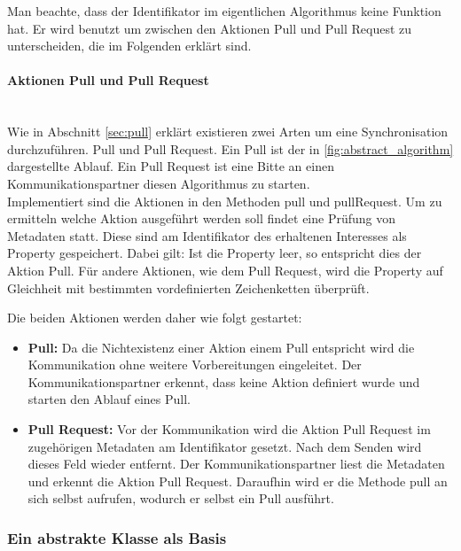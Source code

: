 \documentclass[a4paper]{article}
\begin{document}
	Man beachte, dass der Identifikator im eigentlichen Algorithmus
	keine Funktion hat. Er wird	benutzt um zwischen den Aktionen Pull und Pull
	Request zu unterscheiden, die im Folgenden erklärt sind.	

	\paragraph{Aktionen Pull und Pull Request}\mbox{} \\
	
	Wie in Abschnitt \ref{sec:pull} erklärt existieren zwei Arten um eine
	Synchronisation durchzuführen. Pull und Pull Request. Ein Pull ist der in
	\autoref{fig:abstract_algorithm} dargestellte Ablauf. Ein Pull Request ist
	eine Bitte an einen Kommunikationspartner diesen Algorithmus zu starten. \\
	
	Implementiert sind die Aktionen in den Methoden pull und pullRequest. Um
	zu ermitteln welche Aktion ausgeführt werden soll findet eine Prüfung von
	Metadaten statt. Diese sind am Identifikator des erhaltenen Interesses
	als Property gespeichert. Dabei gilt: Ist die Property leer, so entspricht
	dies der Aktion Pull. Für andere Aktionen, wie dem Pull Request, wird die
	Property auf Gleichheit mit bestimmten vordefinierten Zeichenketten überprüft.
	
	Die beiden Aktionen werden daher wie folgt gestartet:
	
	\begin{itemize}
		\item \textbf{Pull:} Da die Nichtexistenz einer Aktion einem Pull 
		entspricht wird die Kommunikation ohne weitere Vorbereitungen eingeleitet.
		Der Kommunikationspartner erkennt, dass keine Aktion definiert wurde und
		starten den Ablauf eines Pull.
		\item \textbf{Pull Request:} Vor der Kommunikation wird die Aktion
		Pull Request im zugehörigen Metadaten am Identifikator gesetzt. Nach dem
		Senden wird dieses Feld wieder entfernt. Der Kommunikationspartner 
		liest die Metadaten und erkennt die Aktion Pull Request. Daraufhin wird
		er die Methode pull an sich selbst aufrufen, wodurch er selbst ein
		Pull ausführt.
	\end{itemize} 
		
	\subsubsection{Ein abstrakte Klasse als Basis}
	
\end{document}
